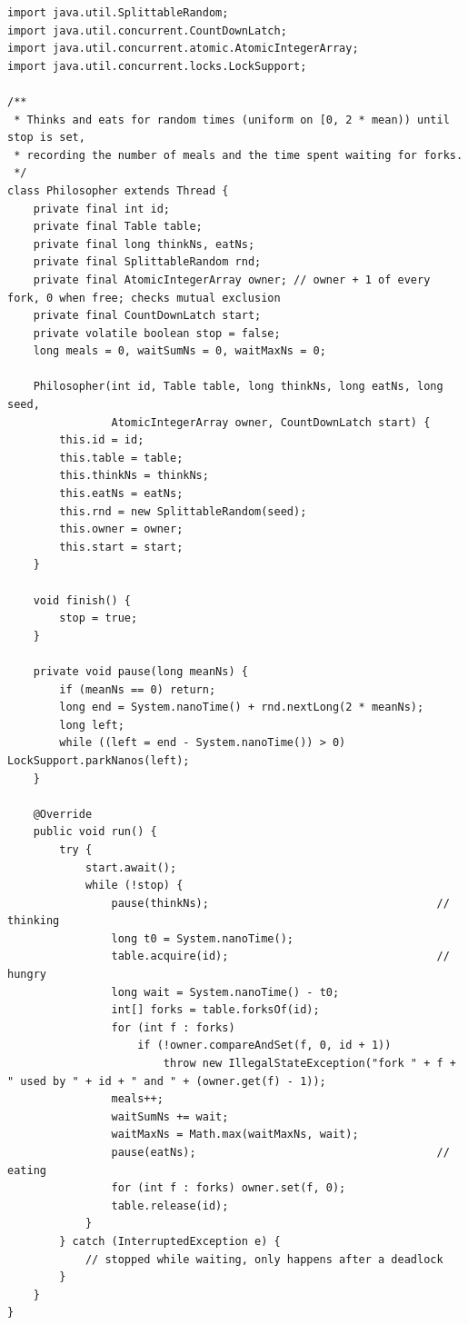 \documentclass[11pt,a4paper]{article}
\begin{document}
\begin{lstlisting}[caption={Klasa \textbf{Philosopher} (\texttt{src/Philosopher.java})}]
import java.util.SplittableRandom;
import java.util.concurrent.CountDownLatch;
import java.util.concurrent.atomic.AtomicIntegerArray;
import java.util.concurrent.locks.LockSupport;

/**
 * Thinks and eats for random times (uniform on [0, 2 * mean)) until stop is set,
 * recording the number of meals and the time spent waiting for forks.
 */
class Philosopher extends Thread {
    private final int id;
    private final Table table;
    private final long thinkNs, eatNs;
    private final SplittableRandom rnd;
    private final AtomicIntegerArray owner; // owner + 1 of every fork, 0 when free; checks mutual exclusion
    private final CountDownLatch start;
    private volatile boolean stop = false;
    long meals = 0, waitSumNs = 0, waitMaxNs = 0;

    Philosopher(int id, Table table, long thinkNs, long eatNs, long seed,
                AtomicIntegerArray owner, CountDownLatch start) {
        this.id = id;
        this.table = table;
        this.thinkNs = thinkNs;
        this.eatNs = eatNs;
        this.rnd = new SplittableRandom(seed);
        this.owner = owner;
        this.start = start;
    }

    void finish() {
        stop = true;
    }

    private void pause(long meanNs) {
        if (meanNs == 0) return;
        long end = System.nanoTime() + rnd.nextLong(2 * meanNs);
        long left;
        while ((left = end - System.nanoTime()) > 0) LockSupport.parkNanos(left);
    }

    @Override
    public void run() {
        try {
            start.await();
            while (!stop) {
                pause(thinkNs);                                   // thinking
                long t0 = System.nanoTime();
                table.acquire(id);                                // hungry
                long wait = System.nanoTime() - t0;
                int[] forks = table.forksOf(id);
                for (int f : forks)
                    if (!owner.compareAndSet(f, 0, id + 1))
                        throw new IllegalStateException("fork " + f + " used by " + id + " and " + (owner.get(f) - 1));
                meals++;
                waitSumNs += wait;
                waitMaxNs = Math.max(waitMaxNs, wait);
                pause(eatNs);                                     // eating
                for (int f : forks) owner.set(f, 0);
                table.release(id);
            }
        } catch (InterruptedException e) {
            // stopped while waiting, only happens after a deadlock
        }
    }
}
\end{lstlisting}
\end{document}
